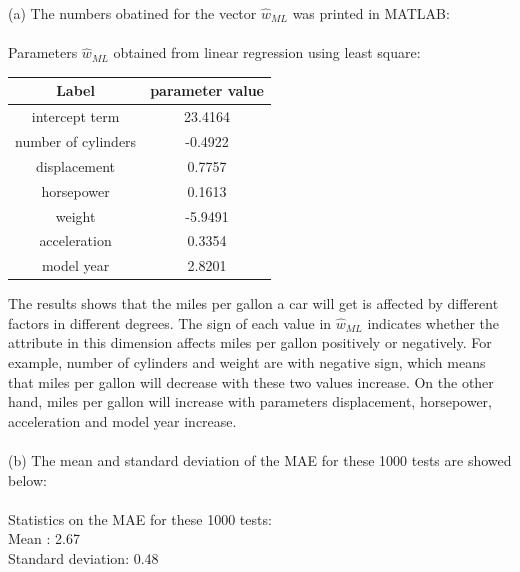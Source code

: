 \documentclass{article}
\begin{document}
(a) The numbers obatined for the vector $\hat{w}_{ML}$ was printed in MATLAB:\\\\
Parameters $\hat{w}_{ML}$ obtained from linear regression using least square: 
\FloatBarrier
\begin{table}[h!]
\centering
\begin{tabular}{|c|c|}
 \hline
Label       & parameter value\\
 \hline
intercept term      & 23.4164\\
 \hline
number of cylinders & -0.4922\\
 \hline
displacement        & 0.7757\\
 \hline
horsepower          & 0.1613\\
 \hline
weight              & -5.9491\\
 \hline
acceleration        & 0.3354\\
 \hline
model year          & 2.8201\\
\hline
\end{tabular}
\end{table}
\FloatBarrier
The results shows that the miles per gallon a car will get is affected by different factors in different degrees.
The sign of each value in $\hat{w}_{ML}$ indicates whether the attribute in this dimension affects miles per gallon positively or negatively. For example, number of cylinders and weight are with negative sign, which means that miles per gallon will decrease with these two values increase. On the other hand, miles per gallon will increase with parameters displacement, horsepower, acceleration and model year increase.\\\\
(b) The mean and standard deviation of the MAE for these 1000 tests are showed below:\\\\
Statistics on the MAE for these 1000 tests: \\
Mean              : 2.67\\
Standard deviation: 0.48\\
\end{document}
